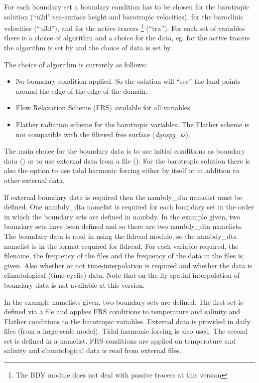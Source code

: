\documentclass[../tex_main/NEMO_manual]{subfiles}
\begin{document}
For each boundary set a boundary condition has to be chosen for the barotropic solution
(``u2d'':sea-surface height and barotropic velocities), for the baroclinic velocities (``u3d''), and
for the active tracers \footnote{The BDY module does not deal with passive tracers at this version} (``tra'').
For each set of variables there is a choice of algorithm and a choice for the data,
eg. for the active tracers the algorithm is set by  and the choice of data is set by . 

The choice of algorithm is currently as follows:

\mbox{}

\begin{itemize}
\item[0.] No boundary condition applied.
  So the solution will ``see'' the land points around the edge of the edge of the domain.
\item[1.] Flow Relaxation Scheme (FRS) available for all variables.
\item[2.] Flather radiation scheme for the barotropic variables.
  The Flather scheme is not compatible with the filtered free surface
  ({\it dynspg\_ts}). 
\end{itemize}

\mbox{}

The main choice for the boundary data is to use initial conditions as boundary data
() or to use external data from a file ().
For the barotropic solution there is also the option to use tidal harmonic forcing either by
itself or in addition to other external data. 

If external boundary data is required then the nambdy\_dta namelist must be defined.
One nambdy\_dta namelist is required for each boundary set in the order in which
the boundary sets are defined in nambdy.
In the example given, two boundary sets have been defined and so there are two nambdy\_dta namelists.
The boundary data is read in using the fldread module,
so the nambdy\_dta namelist is in the format required for fldread.
For each variable required, the filename, the frequency of the files and
the frequency of the data in the files is given.
Also whether or not time-interpolation is required and whether the data is climatological (time-cyclic) data.
Note that on-the-fly spatial interpolation of boundary data is not available at this version. 

In the example namelists given, two boundary sets are defined.
The first set is defined via a file and applies FRS conditions to temperature and salinity and
Flather conditions to the barotropic variables.
External data is provided in daily files (from a large-scale model).
Tidal harmonic forcing is also used.
The second set is defined in a namelist.
FRS conditions are applied on temperature and salinity and climatological data is read from external files. 
\end{document}
